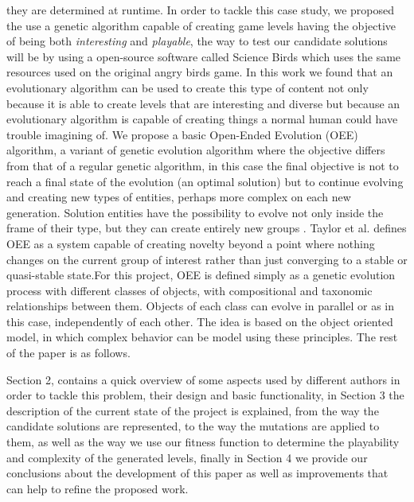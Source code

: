 \documentclass[conference]{IEEEtran}
\begin{document}
    they are determined at runtime.   
    In order to tackle this case study, we proposed the use a genetic algorithm capable 
    of creating game levels having the objective of being both \textit{interesting} and 
    \textit{playable}, the way to test our candidate solutions will be by using a open-source
    software called Science Birds \cite{sciencebirds} which uses the same resources used on the
    original angry birds game.
    In this work we found that an evolutionary algorithm can be used to create 
    this type of content not only because it is able to create levels that are interesting 
    and diverse but because an evolutionary algorithm is capable of creating things a 
    normal human could have trouble imagining of.
    We propose a basic Open-Ended Evolution (OEE) algorithm, a variant of genetic
    evolution algorithm where the objective differs from that of a regular genetic
    algorithm,  in this case the final objective is not to reach a final state of
    the evolution (an optimal solution) but to continue evolving and creating new
    types of entities, perhaps more complex on each new generation. Solution
    entities have the possibility to evolve not only inside the frame of their type,
    but  they can create entirely new groups \cite{Standish2003}. Taylor et al.
    \cite{Taylor2016,Taylor} defines OEE as a system capable of creating novelty
    beyond a point where nothing changes on the current group of interest rather
    than just converging to a stable or quasi-stable state.For this project, OEE is
    defined simply as a genetic evolution process with different classes of objects,
    with compositional and taxonomic relationships between them. Objects of each
    class can evolve in parallel or as in this case, independently of each other. The
    idea is based on the object oriented model, in which complex behavior can be
    model using these principles. The rest of the paper is as follows.
    
    
    Section 2, contains a quick overview of some aspects used by different authors
    in order to tackle this problem, their design and basic functionality, in
    Section 3 the description of the current state of the project is explained, from
    the way the candidate solutions are represented, to the way the mutations are applied 
    to them, as well as the way we use our fitness function to determine the playability
    and complexity of the generated levels, 
    finally in Section 4 we provide our conclusions about the development of this
    paper as well as improvements that can help to refine the proposed work. 
\end{document}
